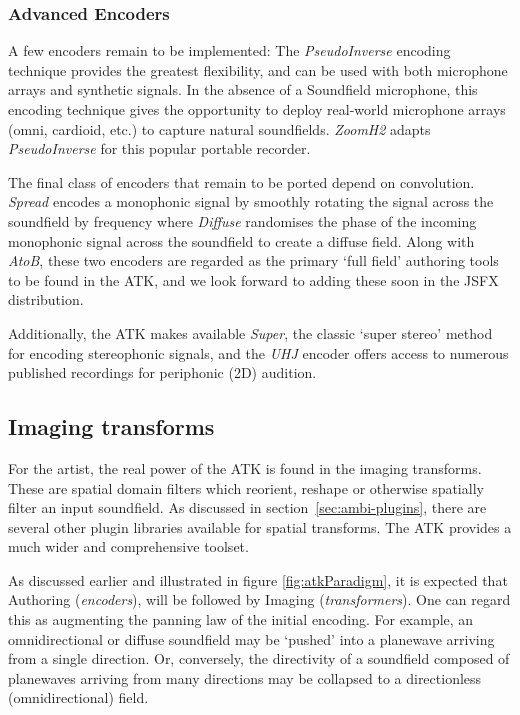 \documentclass{article}
\begin{document}
\subsubsection{Advanced Encoders}\label{sec:impending-encoders}
A few encoders remain to be implemented:
The \emph{PseudoInverse} encoding technique provides the greatest flexibility, and can be used with both microphone arrays and synthetic signals. 
In the absence of a Soundfield microphone, this encoding technique gives the opportunity to deploy real-world microphone arrays (omni, cardioid, etc.) to capture natural soundfields.
\emph{Zoom\-H2} adapts \emph{PseudoInverse} for this popular portable recorder.

The final class of encoders that remain to be ported depend on convolution.
\emph{Spread} encodes a monophonic signal by smoothly rotating the signal across the soundfield by frequency where \emph{Diffuse} randomises the phase of the incoming monophonic signal across the soundfield to create a diffuse field. Along with \emph{AtoB}, these two encoders are regarded as the primary `full field' authoring tools to be found in the ATK, and we look forward to adding these soon in the JSFX distribution.

Additionally, the ATK makes available \emph{Super}, the classic `super stereo' method for encoding stereophonic signals, and the \emph{UHJ} encoder offers access to numerous published recordings for periphonic (2D) audition.


\subsection{Imaging transforms}\label{sec:transforms}

For the artist, the real power of the ATK is found in the imaging transforms.
These are spatial domain filters which reorient, reshape or otherwise spatially filter an input soundfield.
As discussed in section~\ref{sec:ambi-plugins}, there are several other plugin libraries available for spatial transforms.
The ATK provides a much wider and comprehensive toolset.

As discussed earlier and illustrated in figure \ref{fig:atkParadigm}, it is expected that Authoring (\emph{encoders}), will be followed by Imaging (\emph{transformers}). One can regard this as augmenting the panning law of the initial encoding. For example, an omni\-directional or diffuse soundfield may be `pushed' into a planewave arriving from a single direction. Or, conversely, the directivity of a soundfield composed of planewaves arriving from many directions may be collapsed to a direct\-ionless (omnidirectional) field.
\end{document}
